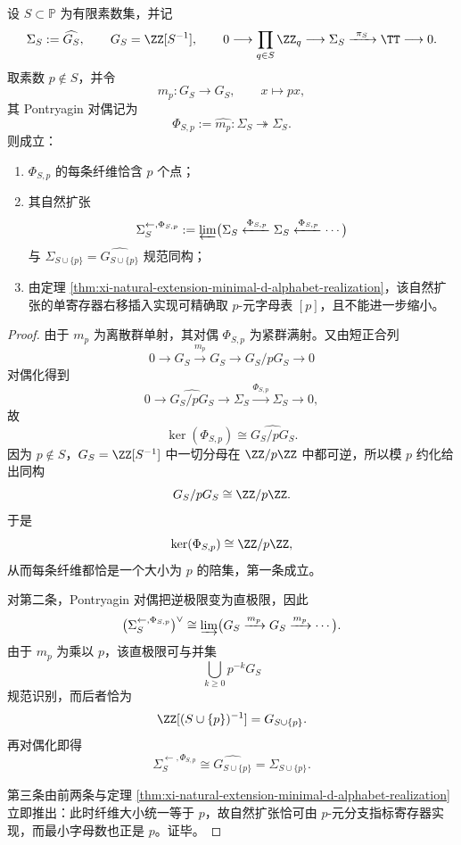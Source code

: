 \begin{theorem}\label{thm:xi-time-part62ac-localized-prime-adjoining-natural-extension}
设 \(S\subset\mathbb P\) 为有限素数集，并记
\[
\Sigma_S:=\widehat{G_S},
\qquad
G_S=\ZZ[S^{-1}],
\qquad
0\longrightarrow \prod_{q\in S}\ZZ_q\longrightarrow \Sigma_S\xrightarrow{\ \pi_S\ }\TT\longrightarrow 0.
\]
取素数 \(p\notin S\)，并令
\[
m_p:G_S\to G_S,
\qquad
x\longmapsto px,
\]
其 Pontryagin 对偶记为
\[
\Phi_{S,p}:=\widehat{m_p}:\Sigma_S\twoheadrightarrow \Sigma_S.
\]
则成立：
\begin{enumerate}
  \item \(\Phi_{S,p}\) 的每条纤维恰含 \(p\) 个点；
  \item 其自然扩张
  \[
  \Sigma_S^{\leftarrow,\Phi_{S,p}}
  :=
  \varprojlim\bigl(\Sigma_S\xleftarrow{\Phi_{S,p}}\Sigma_S\xleftarrow{\Phi_{S,p}}\cdots\bigr)
  \]
  与 \(\Sigma_{S\cup\{p\}}=\widehat{G_{S\cup\{p\}}}\) 规范同构；
  \item 由定理 \ref{thm:xi-natural-extension-minimal-d-alphabet-realization}，该自然扩张的单寄存器右移插入实现可精确取 \(p\)-元字母表 \([p]\)，且不能进一步缩小。
\end{enumerate}
\end{theorem}
\begin{proof}
由于 \(m_p\) 为离散群单射，其对偶 \(\Phi_{S,p}\) 为紧群满射。又由短正合列
\[
0\longrightarrow G_S\xrightarrow{m_p}G_S\longrightarrow G_S/pG_S\longrightarrow 0
\]
对偶化得到
\[
0\longrightarrow \widehat{G_S/pG_S}\longrightarrow \Sigma_S\xrightarrow{\Phi_{S,p}}\Sigma_S\longrightarrow 0,
\]
故
\[
\ker(\Phi_{S,p})\cong \widehat{G_S/pG_S}.
\]
因为 \(p\notin S\)，\(G_S=\ZZ[S^{-1}]\) 中一切分母在 \(\ZZ/p\ZZ\) 中都可逆，所以模 \(p\) 约化给出同构
\[
G_S/pG_S\cong \ZZ/p\ZZ.
\]
于是
\[
\ker(\Phi_{S,p})\cong \ZZ/p\ZZ,
\]
从而每条纤维都恰是一个大小为 \(p\) 的陪集，第一条成立。

对第二条，Pontryagin 对偶把逆极限变为直极限，因此
\[
\bigl(\Sigma_S^{\leftarrow,\Phi_{S,p}}\bigr)^\vee
\cong
\varinjlim\bigl(G_S\xrightarrow{m_p}G_S\xrightarrow{m_p}\cdots\bigr).
\]
由于 \(m_p\) 为乘以 \(p\)，该直极限可与并集
\[
\bigcup_{k\ge 0}p^{-k}G_S
\]
规范识别，而后者恰为
\[
\ZZ[(S\cup\{p\})^{-1}]=G_{S\cup\{p\}}.
\]
再对偶化即得
\[
\Sigma_S^{\leftarrow,\Phi_{S,p}}\cong \widehat{G_{S\cup\{p\}}}=\Sigma_{S\cup\{p\}}.
\]

第三条由前两条与定理 \ref{thm:xi-natural-extension-minimal-d-alphabet-realization} 立即推出：此时纤维大小统一等于 \(p\)，故自然扩张恰可由 \(p\)-元分支指标寄存器实现，而最小字母数也正是 \(p\)。证毕。
\end{proof}

